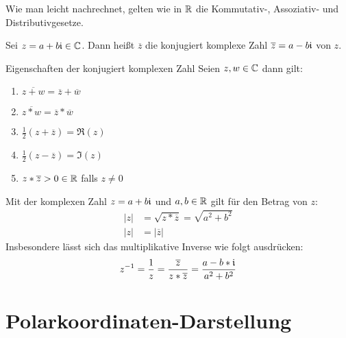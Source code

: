 \bemerkung
Wie man leicht nachrechnet, gelten wie in $\mathbb{R}$ die Kommutativ-, Assoziativ- und Distributivgesetze.

Sei $z=a+b\mathfrak{i}\in\mathbb{C}$. Dann heißt $\overline z$ die konjugiert komplexe Zahl $\overline z=a-b\mathfrak{i}$ von $z$.

\begin{satz}{Eigenschaften der konjugiert komplexen Zahl}
  Seien $z,w\in\mathbb{C}$ dann gilt:
  \begin{enumerate}
    \item $\overline{z+w}=\overline z+\overline w$
    \item $\overline{z* w}=\overline z * \overline w$
    \item $\frac 1 2 (z+\overline z)=\Re(z)$
    \item $\frac 1 2 (z-\overline z)=\Im(z)$
    \item $z* \overline z > 0 \in\mathbb{R}$ falls $z\neq0$
  \end{enumerate}
\end{satz}

Mit der komplexen Zahl $z=a+b\mathfrak{i}$ und $a,b\in\mathbb{R}$ gilt für den Betrag von $z$:
\begin{align*}
  |z|&=\sqrt{z*\overline z}=\sqrt{a^2+b^2}\\
  |z|&=|\overline z|
\end{align*}
Insbesondere lässt sich das multiplikative Inverse wie folgt ausdrücken:
\begin{equation*}
  z^{-1}=\frac 1 z=\frac{\overline z}{z*\overline z}=\frac{a-b*\mathfrak{i}}{a^2+b^2}
\end{equation*}

\section{Polarkoordinaten-Darstellung}

